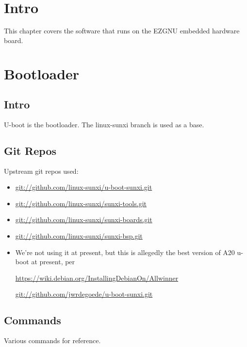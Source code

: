 %
%
%
%
%
\section{Intro}
This chapter covers the software that runs on the EZGNU embedded hardware board.


\section{Bootloader}
\subsection{Intro}
U-boot is the bootloader. The linux-sunxi branch is used as a base.

\subsection{Git Repos}
Upstream git repos used:
\begin{itemize}
  \item{\url{git://github.com/linux-sunxi/u-boot-sunxi.git}}
  \item{\url{git://github.com/linux-sunxi/sunxi-tools.git}}
  \item{\url{git://github.com/linux-sunxi/sunxi-boards.git}}
  \item{\url{git://github.com/linux-sunxi/sunxi-bsp.git}}
  \item{We're not using it at present, but this is allegedly the best version of
  A20 u-boot at present, per
  
  \url{https://wiki.debian.org/InstallingDebianOn/Allwinner}
  
  \url{git://github.com/jwrdegoede/u-boot-sunxi.git}
  }
\end{itemize}

\subsection{Commands}
Various commands for reference.


